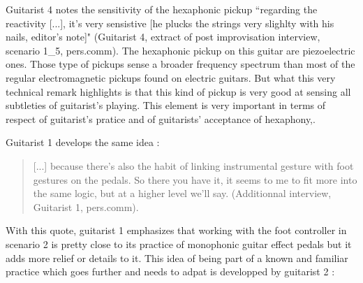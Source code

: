 \documentclass{article}
\begin{document}
Guitarist 4 notes the sensitivity of the hexaphonic pickup ``regarding the reactivity [...], it's very sensistive [he plucks the strings very slighlty with his nails, editor's note]" (Guitarist 4, extract of post improvisation interview,  scenario 1\_5, pers.comm). The hexaphonic pickup on this guitar are piezoelectric ones. Those type of pickups sense a broader frequency spectrum \cite{sci:Lemme_SoundSecret_electricGuitar} than most of the regular electromagnetic pickups found on electric guitars. 
But what this very technical remark highlights is that this kind of pickup is very good at sensing all subtleties of guitarist's playing. This element is very important in terms of respect of guitarist's pratice and of guitarists' acceptance of hexaphony,. 


Guitarist 1 develops the same idea :


\begin{quote}
[...] because there's also the habit of linking instrumental gesture with foot gestures on the pedals. So there you have it, it seems to me to fit more into the same logic, but at a higher level we'll say. (Additionnal interview, Guitarist 1, pers.comm).
\end{quote}

With this quote, guitarist 1 emphasizes that working with the foot controller in scenario 2 is pretty close to its practice of monophonic guitar effect pedals but it adds more relief or details to it. This idea of being part of a known and familiar practice which goes further and needs to adpat is developped by guitarist 2 : 
\end{document}
